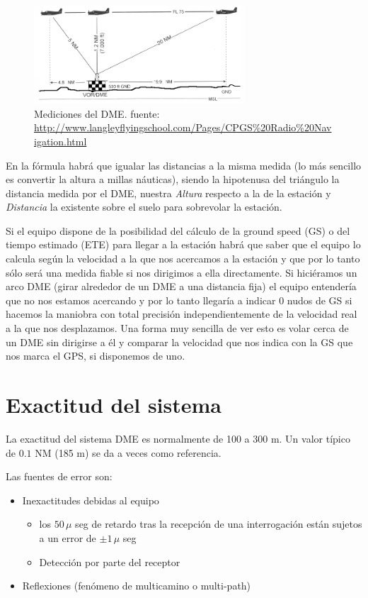 \begin{figure}[!htb]
  \centering
  \includegraphics[width=0.7\textwidth]{Imagenes/06.04.dme.imagenes/DME_overfly.png}
  \caption{Mediciones del DME. {\tiny fuente: \url{http://www.langleyflyingschool.com/Pages/CPGS\%20Radio\%20Navigation.html
}}
}
  \label{fig:DME.mediciones}
\end{figure}

En la f\'ormula habr\'a que igualar las distancias a la misma medida (lo m\'as sencillo es convertir la altura a millas n\'auticas), siendo la hipotenusa del tri\'angulo la distancia medida por el DME,  nuestra \emph{Altura} respecto a la de la estaci\'on y \emph{Distancia} la existente sobre el suelo para sobrevolar la estaci\'on.

Si el equipo dispone de la posibilidad del c\'alculo de la ground speed (GS) o del tiempo estimado (ETE) para llegar a la estaci\'on habr\'a que saber que el equipo lo calcula seg\'un la velocidad a la que nos acercamos a la estaci\'on y que por lo tanto s\'olo ser\'a una medida fiable si nos dirigimos a ella directamente. Si hici\'eramos un arco DME (girar alrededor de un DME a una distancia fija) el equipo entender\'ia que no nos estamos acercando y por lo tanto llegar\'ia a indicar 0 nudos de GS si hacemos la maniobra con total precisi\'on independientemente de la velocidad real a la que nos desplazamos. Una forma muy sencilla de ver esto es volar cerca de un DME sin dirigirse a \'el y comparar la velocidad que nos indica con la GS que nos marca el GPS, si disponemos de uno.

\section{Exactitud del sistema}
\label{sec:DME.exactitud}

La exactitud del sistema DME es normalmente de 100 a 300 m. Un valor t\'ipico de $0.1$ NM (185 m) se da a veces como referencia. 

Las fuentes de error son:
\begin{itemize}
\item Inexactitudes debidas al equipo
  \begin{itemize}
  \item los $50\,\mu$ seg de retardo tras la recepci\'on de una interrogaci\'on
    est\'an sujetos a un error de $\pm 1\,\mu$ seg
  \item Detecci\'on por parte del receptor
  \end{itemize}
\item Reflexiones (fen\'omeno de   multicamino o multi-path)
\end{itemize}

